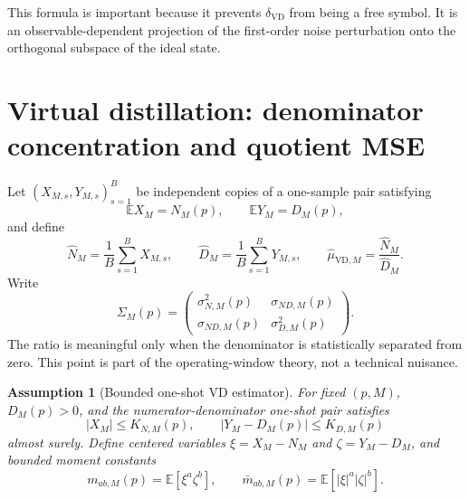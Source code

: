 \documentclass[11pt]{article}
\newtheorem{assumption}{Assumption}
\newcommand{\E}{\mathbb{E}}
\newcommand{\1}{\mathbf{1}}
\newcommand{\abs}[1]{\left\lvert #1 \right\rvert}
\begin{document}
This formula is important because it prevents \(\delta_{\mathrm{VD}}\) from being a free symbol.  It is an observable-dependent projection of the first-order noise perturbation onto the orthogonal subspace of the ideal state.


\section{Virtual distillation: denominator concentration and quotient MSE}

Let \((X_{M,s},Y_{M,s})_{s=1}^B\) be independent copies of a one-sample pair satisfying
\begin{equation}
    \E X_M=N_M(p),
    \qquad
    \E Y_M=D_M(p),
\end{equation}
and define
\begin{equation}
    \widehat N_M=\frac1B\sum_{s=1}^B X_{M,s},
    \qquad
    \widehat D_M=\frac1B\sum_{s=1}^B Y_{M,s},
    \qquad
    \widehat\mu_{\mathrm{VD},M}=\frac{\widehat N_M}{\widehat D_M}.
\end{equation}
Write
\begin{equation}
    \Sigma_M(p)=
    \begin{pmatrix}
        \sigma_{N,M}^2(p) & \sigma_{ND,M}(p)\\
        \sigma_{ND,M}(p) & \sigma_{D,M}^2(p)
    \end{pmatrix}.
\end{equation}
The ratio is meaningful only when the denominator is statistically separated from zero.  This point is part of the operating-window theory, not a technical nuisance.

\begin{assumption}[Bounded one-shot VD estimator]
\label{ass:bounded_vd_pair_v4}
For fixed \((p,M)\), \(D_M(p)>0\), and the numerator-denominator one-shot pair satisfies
\begin{equation}
    \abs{X_M}\leq K_{N,M}(p),
    \qquad
    \abs{Y_M-D_M(p)}\leq K_{D,M}(p)
\end{equation}
almost surely.  Define centered variables \(\xi=X_M-N_M\) and \(\zeta=Y_M-D_M\), and bounded moment constants
\begin{equation}
    m_{ab,M}(p)=\E[\xi^a\zeta^b],
    \qquad
    \bar m_{ab,M}(p)=\E[\abs{\xi}^a\abs{\zeta}^b].
\end{equation}
\end{assumption}
\end{document}
